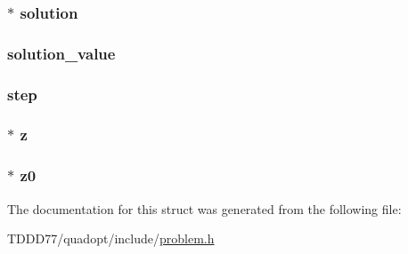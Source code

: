 \subsubsection[{solution}]{$\ast$ solution}\label{structproblem_a70626c7db657c601438f867391005721}
\hypertarget{structproblem_a6fcb6ec86b1ba65bd2a34e9a9731c452}{}
\subsubsection[{solution\+\_\+value}]{ solution\+\_\+value}\label{structproblem_a6fcb6ec86b1ba65bd2a34e9a9731c452}
\hypertarget{structproblem_a9c398bc1d126ef3a4cf1efdc9d9f7423}{}
\subsubsection[{step}]{ step}\label{structproblem_a9c398bc1d126ef3a4cf1efdc9d9f7423}
\hypertarget{structproblem_a840058b5c67561185c94da497d0d3da6}{}
\subsubsection[{z}]{$\ast$ z}\label{structproblem_a840058b5c67561185c94da497d0d3da6}
\hypertarget{structproblem_a2f7d9aba872a4653770df8dd6e3826a1}{}
\subsubsection[{z0}]{$\ast$ z0}\label{structproblem_a2f7d9aba872a4653770df8dd6e3826a1}


The documentation for this struct was generated from the following file\+:\begin{DoxyCompactItemize}
\item 
T\+D\+D\+D77/quadopt/include/\hyperlink{problem_8h}{problem.\+h}\end{DoxyCompactItemize}
